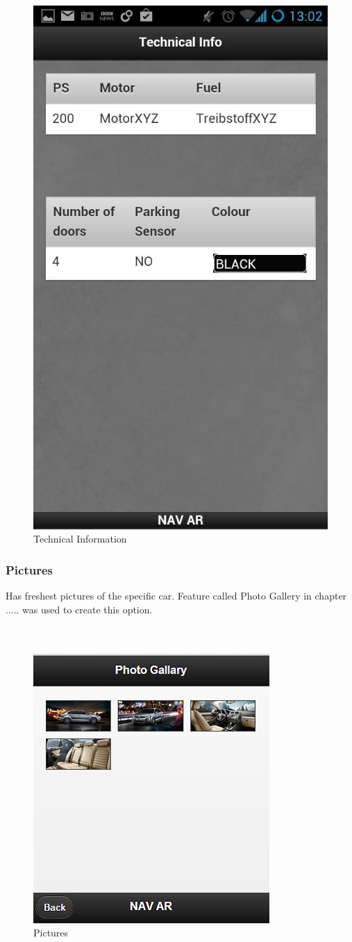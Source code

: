 \begin{figure}[h]
\centering
\includegraphics[width=0.5\linewidth]{graphics/chapter4/6}
\caption{Technical Information}
\end{figure}
\newpage

\subsubsection{Pictures}
Has freshest pictures of the specific car. Feature called Photo Gallery in chapter ..... was used to create this option.
\\\\\\
\begin{figure}[h]
\centering
\includegraphics[width=0.5\linewidth]{graphics/chapter4/7}
\caption{Pictures}
\end{figure}
\newpage

